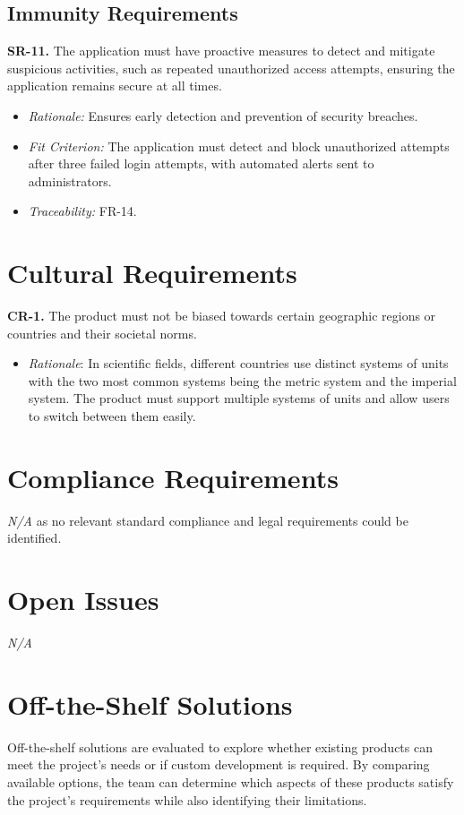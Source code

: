 \documentclass[12pt]{article}
\begin{document}
\subsection{Immunity Requirements}
\textbf{SR-11.} The application must have proactive measures to detect
  and mitigate suspicious activities, such as repeated unauthorized access
  attempts, ensuring the application remains secure at all times.
  \begin{itemize}
    \item \textit{Rationale:} Ensures early detection and prevention of security
    breaches.
    \item \textit{Fit Criterion:} The application must detect and block
    unauthorized attempts after three failed login attempts, with automated
    alerts sent to administrators.
    \item \textit{Traceability:} FR-14.
  \end{itemize}

\section{Cultural Requirements}
\textbf{CR-1.} The product must not be biased towards certain geographic regions or countries and their societal norms.
\begin{itemize}
  \item \emph{Rationale}: In scientific fields, different countries use distinct systems of units with the two most
  common systems being the metric system and the imperial system. The product must support multiple systems of units
  and allow users to switch between them easily.
\end{itemize}

\section{Compliance Requirements}
\emph{N/A} as no relevant standard compliance and legal requirements could be identified.

\section{Open Issues}
\emph{N/A}
\section{Off-the-Shelf Solutions}

Off-the-shelf solutions are evaluated to explore whether existing products can
meet the project’s needs or if custom development is required. By comparing
available options, the team can determine which aspects of these products
satisfy the project's requirements while also identifying their limitations.
\end{document}
